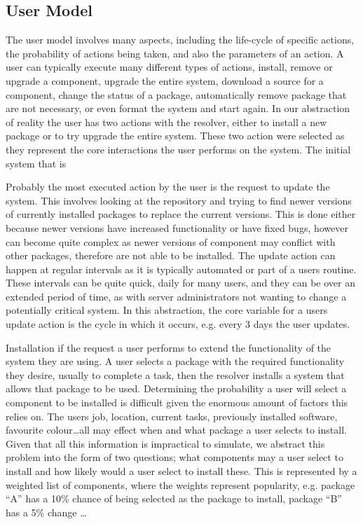 \subsection{User Model}
The user model involves many aspects, including the life-cycle of specific actions, the probability of actions being taken, and also the parameters of an action.
A user can typically execute many different types of actions, install, remove or upgrade a component, upgrade the entire system,
download a source for a component, change the status of a package, automatically remove package that are not necessary, or even format the system and start again.
In our abstraction of reality the user has two actions with the resolver, either to install a new package or to try upgrade the entire system.
These two action were selected as they represent the core interactions the user performs on the system.
The initial system that is 

Probably the most executed action by the user is the request to update the system.
This involves looking at the repository and trying to find newer versions of currently installed packages to replace the current versions.
This is done either because newer versions have increased functionality or have fixed bugs,
however can become quite complex as newer versions of component may conflict with other packages, therefore are not able to be installed.
The update action can happen at regular intervals as it is typically automated or part of a users routine.
These intervals can be quite quick, daily for many users, 
and they can be over an extended period of time, 
as with server administrators not wanting to change a potentially critical system.
In this abstraction, the core variable for a users update action is the cycle in which it occurs,
e.g. every 3 days the user updates.

Installation if the request a user performs to extend the functionality of the system they are using.
A user selects a package with the required functionality they desire, usually to complete a task,
then the resolver installs a system that allows that package to be used.
Determining the probability a user will select a component to be installed is difficult given the enormous amount of factors this relies on.
The users job, location, current tasks, previously installed software, favourite colour\ldots all may effect when and what package a user selects to install.
Given that all this information is impractical to simulate, we abstract this problem into the form of two questions;
what components may a user select to install and how likely would a user select to install these.
This is represented by a weighted list of components, where the weights represent popularity,
e.g. package ``A'' has a 10\% chance of being selected as the package to install, package ``B'' has a 5\% change \ldots

